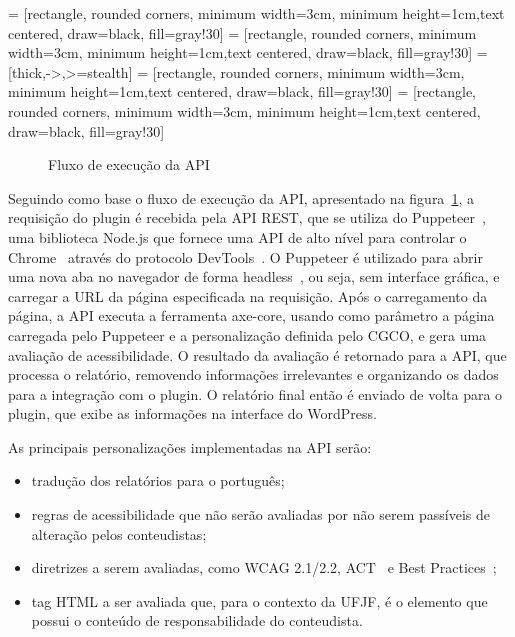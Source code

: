 \documentclass[
	article,			%
	12pt,				%
	oneside,			%
	a4paper,			%
	section=TITLE,		%
	subsection=TITLE,	%
	english,			%
	brazil,				%
	sumario=tradicional
	]{abntex2}
\begin{document}
 = [rectangle, rounded corners, minimum width=3cm,
minimum height=1cm,text centered, draw=black, fill=gray!30]
 = [rectangle, rounded corners, minimum width=3cm,
minimum height=1cm,text centered, draw=black, fill=gray!30]
 = [thick,->,>=stealth]
 = [rectangle, rounded corners, minimum width=3cm,
minimum height=1cm,text centered, draw=black, fill=gray!30]
 = [rectangle, rounded corners, minimum width=3cm,
minimum height=1cm,text centered, draw=black, fill=gray!30]
\begin{figure}[ht]
    \centering
    \caption{Fluxo de execução da API}
    \label{fig:fluxo}
\end{figure}

Seguindo como base o fluxo de execução da API, apresentado na figura~\ref{fig:fluxo},
a requisição do plugin é recebida pela API REST, que se utiliza
do Puppeteer~\cite{puppeteer}, uma biblioteca Node.js que fornece uma
API de alto nível para controlar o Chrome~\cite{chrome} através do protocolo
DevTools~\cite{devtools}. O Puppeteer é utilizado para abrir uma nova aba no navegador de forma
headless~\cite{headless}, ou seja, sem interface gráfica, e carregar a URL da página
especificada na requisição. Após o carregamento da página, a API
executa a ferramenta axe-core, usando como parâmetro a página carregada
pelo Puppeteer e a personalização definida pelo CGCO, e gera uma avaliação
de acessibilidade. O resultado da avaliação é retornado para a API, que
processa o relatório, removendo informações irrelevantes e organizando os dados
para a integração com o plugin. O relatório final então é enviado de
volta para o plugin, que exibe as informações na interface do WordPress.

As principais personalizações implementadas na API serão:
\begin{itemize}
\item tradução dos relatórios para o português; 
\item regras de acessibilidade que 
não serão avaliadas por não serem passíveis de alteração pelos conteudistas;
\item diretrizes a serem avaliadas, como WCAG 2.1/2.2, ACT~\cite{ACT} e Best
Practices~\cite{BP};
\item tag HTML a ser avaliada que, para o contexto da UFJF, é o elemento que possui o conteúdo de responsabilidade do conteudista.
\end{itemize}
\end{document}
